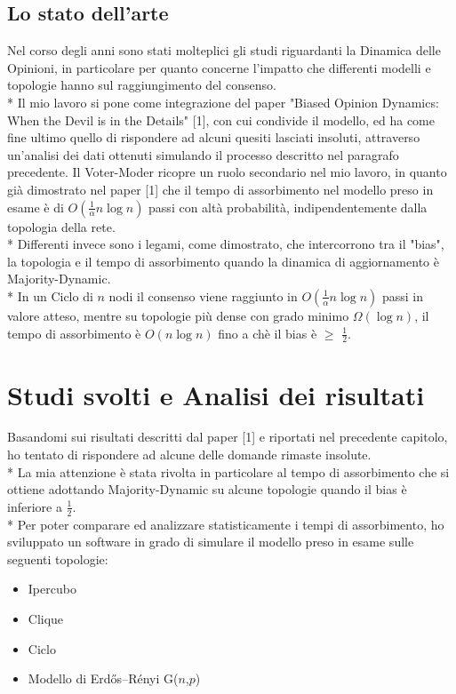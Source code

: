 \documentclass{article}
\begin{document}
\subsection{Lo stato dell'arte}
Nel corso degli anni sono stati molteplici gli studi riguardanti la Dinamica delle Opinioni, in particolare per quanto concerne l'impatto che differenti modelli e topologie hanno sul raggiungimento del consenso.\\*
Il mio lavoro si pone come integrazione del paper "Biased Opinion Dynamics: When the Devil is in the Details" [1], con cui condivide il modello, ed ha come fine ultimo quello di rispondere ad alcuni quesiti lasciati insoluti, attraverso un'analisi dei dati ottenuti simulando il processo descritto nel paragrafo precedente.
Il Voter-Moder ricopre un ruolo secondario nel mio lavoro, in quanto già dimostrato nel paper [1] che il tempo di assorbimento nel modello preso in esame è di $O(\frac{1}{\alpha}n\log{}n)$ passi con altà probabilità, indipendentemente dalla topologia della rete.\\*
Differenti invece sono i legami, come dimostrato, che intercorrono tra il "bias", la topologia e il tempo di assorbimento quando la dinamica di aggiornamento è Majority-Dynamic.\\*
In un Ciclo di $n$ nodi il consenso viene raggiunto in $O(\frac{1}{\alpha}n\log{}n)$ passi in valore atteso, mentre su topologie più dense con grado minimo $\Omega(\log{}n)$, il tempo di assorbimento è $O(n\log{}n)$ fino a chè il bias è $\geq$ $\frac{1}{2}$.


\section{Studi svolti e Analisi dei risultati}
Basandomi sui risultati descritti dal paper [1] e riportati nel precedente capitolo, ho tentato di rispondere ad alcune delle domande rimaste insolute.\\*
La mia attenzione è stata rivolta in particolare al tempo di assorbimento che si ottiene adottando Majority-Dynamic su alcune topologie quando il bias è inferiore a $\frac{1}{2}$.\\*
Per poter comparare ed analizzare statisticamente i tempi di assorbimento, ho sviluppato un software in grado di simulare il modello preso in esame sulle seguenti topologie:
 \begin{itemize}
\item Ipercubo
\item Clique
\item Ciclo
\item Modello di Erdős–Rényi G($n$,$p$)
\end{itemize}
\end{document}
